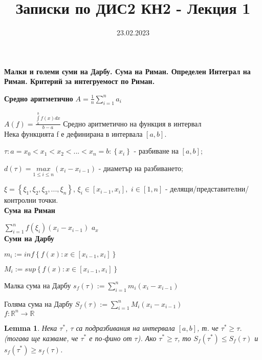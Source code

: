 \documentclass[12pt]{article}
\newtheorem{lemma}{Lemma}
\begin{document}
	\color{white}
	\pagecolor{darkgray}
	\title{Записки по ДИС2 КН2 - Лекция 1}
	\date{23.02.2023}
	\maketitle
	\begin{center}
		\Large
		\textbf{Малки и големи суми на Дарбу. Сума на Риман. Определен Интеграл на Риман. Критерий за интегруемост по Риман.}
	\end{center}
	\textbf{Средно аритметично}
	$A=\frac{1}{n}\sum _{i=1}^{n}{a}_{i}$
	
	
	$A\left(f\right)=\frac{\underset{a}{\overset{b}{\int }}f\left(x\right)dx}{b-a} $ Средно аритметично на функция в интервал
	\\
	
	Нека функцията f е дефинирана в интервала $\left[a, b\right]$.
	
	$\tau : a=x_{0}<x_{1}<x_{2}<...<x_{n}=b : \left\{x_{i}\right\}$ - разбиване на $\left[a, b\right]$;
	
	$d\left(\tau\right)=\underset{1\leq i\leq n}{max}\left(x_{i} - x_{i-1}\right)$ - диаметър на разбиването;
	
	$\xi = \left\{\xi_{1}, \xi_{2}, \xi_{3}, ..., \xi _{n}\right\}$, $\xi_{i} \in \left[x_{i-1}, x_{i}\right],$ $i \in \left[1, n\right]$ - делящи/представителни/контролни точки.
	\\ 
	
	\textbf{Сума на Риман}
	
	$\sum _{i=1}^{n} f\left(\xi _{i}\right)\left(x_{i} - x_{i-1}\right)$
	$a_{x}$
	\\
	
	\textbf{Суми на Дарбу}
	
	$m_{i} := inf\left\{f\left(x\right): x\in \left[x_{i-1}, x_{i}\right]\right\}$
	
	$M_{i} := sup\left\{f\left(x\right): x\in \left[x_{i-1}, x_{i}\right]\right\}$
	
	
	Малка сума на Дарбу 
	$s_{f}\left(\tau\right) := \sum _{i=1}^{n} m_{i}\left(x_{i}-x_{i-1}\right)$
	
	Голяма сума на Дарбу
	$S_{f}\left(\tau\right) := \sum _{i=1}^{n} M_{i}\left(x_{i}-x_{i-1}\right)$
	\\
	
	$f: \mathbb{R}^{n} \rightarrow \mathbb{R}$
	\begin{lemma}
		Нека $\tau^{*}$, $\tau$ са подразбивания на интервала $\left[a, b\right]$, т. че  $\tau^{*} \geq \tau$. 
		(тогава ще казваме, че $\tau^{*}$ е по-фино от $\tau$). 
		Ако $\tau^{*} \geq \tau$, то $S_{f}\left(\tau^{*}\right) \leq S_{f}\left(\tau\right)$ и $s_{f}\left(\tau^{*}\right) \geq s_{f}\left(\tau\right)$.
		\\
	\end{lemma}
	
\end{document}
